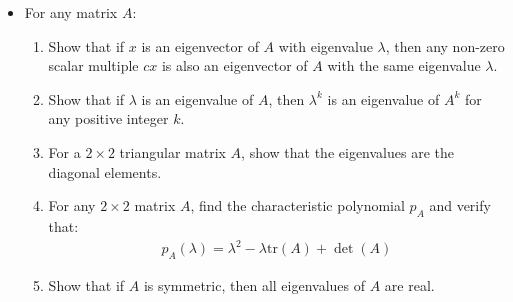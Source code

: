 \begin{frame}{}
\begin{itemize}
    \item For any matrix $A$:
\begin{enumerate}
    \item Show that if $x$ is an eigenvector of $A$ with eigenvalue $\lambda$, then any non-zero scalar multiple $cx$ is also an eigenvector of $A$ with the same eigenvalue $\lambda$.
    \item Show that if $\lambda$ is an eigenvalue of $A$, then $\lambda^k$ is an eigenvalue of $A^k$ for any positive integer $k$.
    \item For a $2\times 2$ triangular matrix $A$, show that the eigenvalues are the diagonal elements.
    \item For any $2\times 2$ matrix $A$, find the characteristic polynomial $p_A$ and verify that:
    \begin{align}
        p_A(\lambda) = \lambda^2 - \lambda \text{tr}(A) + \det(A)
    \end{align}
   \item Show that if $A$ is symmetric, then all eigenvalues of $A$ are real.
\end{enumerate}
\end{itemize}
\end{frame}



